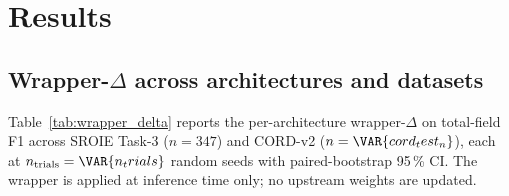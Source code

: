 
\section{Results}
\label{sec:results}

\subsection{Wrapper-$\Delta$ across architectures and datasets}
\label{sec:results_wrapper_delta}

Table~\ref{tab:wrapper_delta} reports the per-architecture
wrapper-$\Delta$ on \textsf{total}-field F1 across SROIE Task-3
($n=347$) and CORD-v2 ($n=\VAR{cord_test_n}$), each at
$n_{\text{trials}}=\VAR{n_trials}$ random seeds with paired-bootstrap
95\,\% CI.  The wrapper is applied at inference time only; no
upstream weights are updated.

